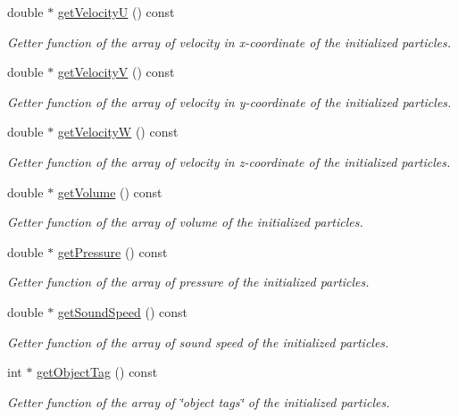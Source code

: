 \begin{DoxyCompactItemize}
double $\ast$ \hyperlink{classInitializer_a519f3ec935a5c159c564d7877ee5b9a9}{get\-Velocity\-U} () const 
\begin{DoxyCompactList}\small\item\em Getter function of the array of velocity in x-\/coordinate of the initialized particles. \end{DoxyCompactList}\item 
double $\ast$ \hyperlink{classInitializer_aaba9434291386479dbeda9c1b436556b}{get\-Velocity\-V} () const 
\begin{DoxyCompactList}\small\item\em Getter function of the array of velocity in y-\/coordinate of the initialized particles. \end{DoxyCompactList}\item 
double $\ast$ \hyperlink{classInitializer_ad522318d3fe5d4d3019941cd75b4a078}{get\-Velocity\-W} () const 
\begin{DoxyCompactList}\small\item\em Getter function of the array of velocity in z-\/coordinate of the initialized particles. \end{DoxyCompactList}\item 
double $\ast$ \hyperlink{classInitializer_ade9b3fe198ecb8b7b4d0f90a34e69b41}{get\-Volume} () const 
\begin{DoxyCompactList}\small\item\em Getter function of the array of volume of the initialized particles. \end{DoxyCompactList}\item 
double $\ast$ \hyperlink{classInitializer_aa20c070f47fbef85698018de12a73861}{get\-Pressure} () const 
\begin{DoxyCompactList}\small\item\em Getter function of the array of pressure of the initialized particles. \end{DoxyCompactList}\item 
double $\ast$ \hyperlink{classInitializer_a2fc7adb85eb243906fc756b4f124ebef}{get\-Sound\-Speed} () const 
\begin{DoxyCompactList}\small\item\em Getter function of the array of sound speed of the initialized particles. \end{DoxyCompactList}\item 
int $\ast$ \hyperlink{classInitializer_a8f419c10688793258e1359ea25683bca}{get\-Object\-Tag} () const 
\begin{DoxyCompactList}\small\item\em Getter function of the array of \char`\"{}object tags\char`\"{} of the initialized particles. \end{DoxyCompactList}\item 

\end{DoxyCompactItemize}
